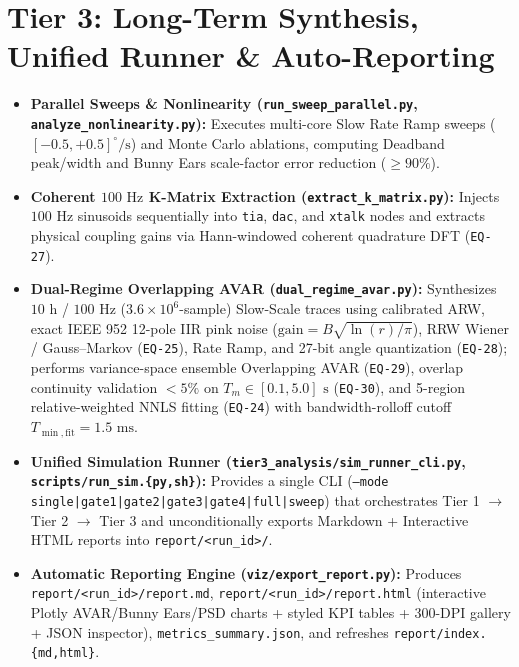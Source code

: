 \documentclass[11pt,a4paper]{article}
\begin{document}
\section{Tier 3: Long-Term Synthesis, Unified Runner \& Auto-Reporting}

\begin{itemize}
    \item \textbf{Parallel Sweeps \& Nonlinearity (\texttt{run\_sweep\_parallel.py}, \texttt{analyze\_nonlinearity.py}):} Executes multi-core Slow Rate Ramp sweeps ($[-0.5, +0.5]^\circ/\text{s}$) and Monte Carlo ablations, computing Deadband peak/width and Bunny Ears scale-factor error reduction ($\ge 90\%$).
    \item \textbf{Coherent $100\text{ Hz}$ $\mathbf{K}$-Matrix Extraction (\texttt{extract\_k\_matrix.py}):} Injects $100\text{ Hz}$ sinusoids sequentially into \texttt{tia}, \texttt{dac}, and \texttt{xtalk} nodes and extracts physical coupling gains via Hann-windowed coherent quadrature DFT (\texttt{EQ-27}).
    \item \textbf{Dual-Regime Overlapping AVAR (\texttt{dual\_regime\_avar.py}):} Synthesizes $10\text{ h}$ / $100\text{ Hz}$ ($3.6\times 10^6$-sample) Slow-Scale traces using calibrated ARW, exact IEEE 952 12-pole IIR pink noise ($\text{gain} = B\sqrt{\ln(r)/\pi}$), RRW Wiener / Gauss--Markov (\texttt{EQ-25}), Rate Ramp, and 27-bit angle quantization (\texttt{EQ-28}); performs variance-space ensemble Overlapping AVAR (\texttt{EQ-29}), overlap continuity validation $< 5\%$ on $T_m \in [0.1, 5.0]\text{ s}$ (\texttt{EQ-30}), and 5-region relative-weighted NNLS fitting (\texttt{EQ-24}) with bandwidth-rolloff cutoff $T_{\min,\text{fit}} = 1.5\text{ ms}$.
    \item \textbf{Unified Simulation Runner (\texttt{tier3\_analysis/sim\_runner\_cli.py}, \texttt{scripts/run\_sim.\{py,sh\}}):} Provides a single CLI (\texttt{--mode single|gate1|gate2|gate3|gate4|full|sweep}) that orchestrates Tier 1 $\to$ Tier 2 $\to$ Tier 3 and unconditionally exports Markdown + Interactive HTML reports into \texttt{report/<run\_id>/}.
    \item \textbf{Automatic Reporting Engine (\texttt{viz/export\_report.py}):} Produces \texttt{report/<run\_id>/report.md}, \texttt{report/<run\_id>/report.html} (interactive Plotly AVAR/Bunny Ears/PSD charts + styled KPI tables + 300-DPI gallery + JSON inspector), \texttt{metrics\_summary.json}, and refreshes \texttt{report/index.\{md,html\}}.
\end{itemize}
\end{document}
